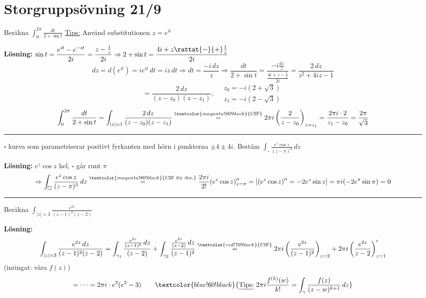\section{Storgruppsövning 21/9}

 \quad Beräkna $\displaystyle\int_0^{2\pi} \frac{dt}{2 + \sin t}$ \qquad \textcolor{magenta!80!black}{\underline{Tips:} Använd substitutionen $z = e^{it}$}

\textbf{Lösning:} $\sin t = \dfrac{e^{it} - e^{-it}}{2i} = \dfrac{z - \frac{1}{z}}{2i} \Rightarrow 2 + \sin t = \dfrac{4i + z \rattat{-}{+} \frac{1}{z}}{2i}$
\[ dz = d(e^{it}) = ie^{it}\,dt = iz\,dt \Rightarrow dt = \frac{-i\,dz}{z} \Rightarrow \frac{dt}{2 + \sin t} = \frac{-i\frac{dz}{z}}{\frac{4i + z - \frac{1}{z}}{2i}} = \frac{2\,dz}{z^2 + 4iz - 1} \]
\[ = \frac{2\,dz}{(z - z_0)(z - z_1)}, \quad \begin{array}{l} z_0 = -i(2 + \sqrt{3}) \\ z_1 = -i(2 - \sqrt{3}) \end{array} \]
\[ \int_0^{2\pi} \frac{dt}{2 + \sin t} = \int_{|z| = 1} \frac{2\,dz}{(z - z_0)(z - z_1)} \overset{\textcolor{magenta!80!black}{\text{CIF}}}{=} 2\pi i \left( \frac{2}{z - z_0} \right)_{z = z_1} = \frac{2\pi i \cdot 2}{z_1 - z_0} = \frac{2\pi}{\sqrt{3}} \]

\noindent\rule{\linewidth}{0.4pt}

 \quad $\square$ kurva som parametriserar positivt fyrkanten med hörn i punkterna $\pm 4 \pm 4i$. Bestäm $\displaystyle\int_\square \frac{e^z \cos z}{(z - \pi)^3}\,dz$

\textbf{Lösning:}
$e^z \cos z$ hel, $\square$ går runt $\pi$
\[ \Rightarrow \int_\square \frac{e^z \cos z}{(z - \pi)^3}\,dz \overset{\textcolor{magenta!80!black}{\text{CIF för der.}}}{=} \frac{2\pi i}{2!}(e^z \cos z)''_{z = \pi} = \left[ (e^z \cos z)'' = -2e^z \sin z \right] = \pi i(-2e^\pi \sin \pi) = 0 \]

\noindent\rule{\linewidth}{0.4pt}

 \quad Beräkna $\displaystyle\int_{|z| = 3} \frac{e^{2z}}{(z - 1)^2(z - 2)}$

\textbf{Lösning:}
\[ \int_{|z| = 3} \frac{e^{2z}\,dz}{(z - 1)^2(z - 2)} = \int_{\gamma_1} \frac{\frac{e^{2z}}{(z - 1)^2}\,dz}{(z - 2)} + \int_{\gamma_2} \frac{\frac{e^{2z}}{(z - 2)}\,dz}{(z - 1)^2} \overset{\textcolor{red!70!black}{\text{CIF}}}{=} 2\pi i \left( \frac{e^{2z}}{(z - 1)^2} \right)_{z = 2} + 2\pi i \left( \frac{e^{2z}}{z - 2} \right)'_{z = 1} \]
\textcolor{magenta!80!black}{(inringat: våra $f(z)$)}
\[ = \dots = 2\pi i \cdot e^2(e^2 - 3) \qquad \textcolor{blue!60!black}{\underline{\text{Tips:}} \ 2\pi i \frac{f^{(k)}(w)}{k!} = \int_\gamma \frac{f(z)}{(z - w)^{k+1}}\,dz} \]
